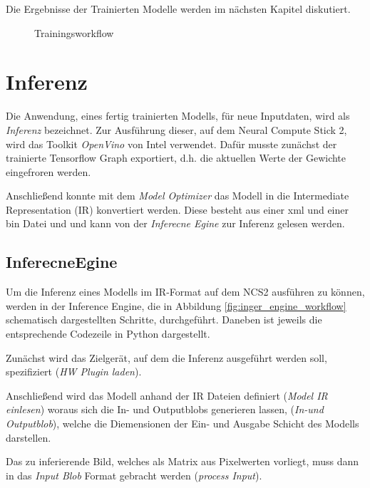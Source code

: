 Die Ergebnisse der Trainierten Modelle 
werden im nächsten Kapitel diskutiert.


\vspace{1cm}
\begin{figure}[H]
    \centering
    
    \caption{Trainingsworkflow}
    \label{fig:train_workflow}
\end{figure}
\vspace{1cm}


\section{Inferenz}\label{sec:inferenz}

Die Anwendung, eines fertig trainierten Modells, für 
neue Inputdaten, wird als \textit{Inferenz} bezeichnet.
Zur Ausführung dieser, auf dem Neural Compute Stick 2, 
wird das Toolkit \textit{OpenVino} von Intel verwendet.
Dafür musste zunächst der trainierte Tensorflow Graph 
exportiert, d.h. die aktuellen Werte der Gewichte 
eingefroren werden.

Anschließend konnte mit dem \textit{Model Optimizer}
das Modell in die Intermediate Representation (IR)
konvertiert werden.
Diese besteht aus einer xml und einer bin Datei und 
und kann von der \textit{Inferecne Egine} 
zur Inferenz gelesen werden.


\subsection*{InferecneEgine}

Um die Inferenz eines Modells im IR-Format 
auf dem NCS2 ausführen zu können, werden 
in der Inference Engine, die in Abbildung 
\ref{fig:inger_engine_workflow} schematisch
dargestellten Schritte, durchgeführt.
Daneben ist jeweils die entsprechende 
Codezeile in Python dargestellt.

Zunächst wird das Zielgerät, auf dem 
die Inferenz ausgeführt werden soll,
spezifiziert (\textit{HW Plugin laden}).

Anschließend wird das Modell anhand der 
IR Dateien definiert (\textit{Model IR einlesen})
woraus sich die In- und Outputblobs generieren 
lassen, (\textit{In-und Outputblob}), 
welche die Diemensionen der Ein- und Ausgabe 
Schicht des Modells darstellen.

Das zu inferierende Bild,
welches als Matrix aus Pixelwerten 
vorliegt, muss dann in das \textit{Input Blob}
Format gebracht werden (\textit{process Input}).

